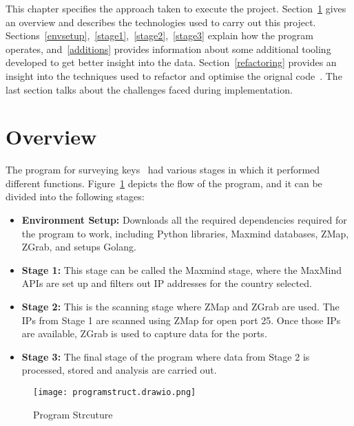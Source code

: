 This chapter specifies the approach taken to execute the project. Section~\ref*{codeoverview} gives an overview and 
describes the technologies used to carry out this project. Sections~\ref*{envsetup},~\ref*{stage1},~\ref*{stage2},~\ref*{stage3} 
explain how the program operates, and~\ref*{additions} provides information about some additional tooling developed to get better insight into the data. 
Section~\ref*{refactoring} provides an insight into the techniques used to refactor and optimise the orignal code~\cite{sftcdsur24:online}. 
The last section talks about the challenges faced during implementation.  

\section{Overview}
\label{codeoverview}
The program for surveying keys~\cite{sethr07s72:online} had various stages in which it performed different functions. Figure~\ref*{programstruct} depicts the flow of the program, and it can be divided into the following stages:
\begin{itemize}
    \item \textbf{Environment Setup:} Downloads all the required dependencies required for the program to work, including Python libraries, Maxmind databases, ZMap, ZGrab, and setups Golang.
    \item \textbf{Stage 1:} This stage can be called the Maxmind stage, where the MaxMind APIs are set up and filters out IP addresses for the country selected. 
    \item \textbf{Stage 2:} This is the scanning stage where ZMap and ZGrab are used. The IPs from Stage 1 are scanned using ZMap for open port 25. Once those IPs are available, ZGrab is used to capture data for the ports. 
    \item \textbf{Stage 3:} The final stage of the program where data from Stage 2 is processed, stored and analysis are carried out. 
\end{itemize}
\begin{figure}[h]
    \centering
    \texttt{[image: programstruct.drawio.png]}
    \caption{Program Strcuture}
    \label{fig: Program Strcuture}
    \label{programstruct}
\end{figure}


